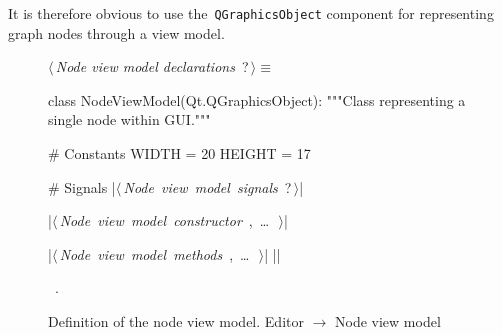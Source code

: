 \documentclass[%
    a4paper,    %
    justified,  %
    nobib,      %
    openany     %
]{tufte-book}
\begin{document}
It is therefore obvious to use the~\verb=QGraphicsObject= component
for representing graph nodes through a view model.

\begin{figure}
\begin{flushleft} \small
\begin{minipage}{\linewidth}\label{scrap68}\raggedright\small
{} $\langle\,${\itshape Node view model declarations}\nobreak\ {\footnotesize {?}}$\,\rangle\equiv$
\vspace{-1ex}
\begin{pythoncode}
class NodeViewModel(Qt.QGraphicsObject):
    """Class representing a single node within GUI."""

    # Constants
    WIDTH = 20
    HEIGHT = 17

    # Signals
    |\hbox{$\langle\,${\itshape Node view model signals}\nobreak\ {\footnotesize ?}$\,\rangle$}|

    |\hbox{$\langle\,${\itshape Node view model constructor}\nobreak\ {\footnotesize {}, \ldots\ }$\,\rangle$}|

    |\hbox{$\langle\,${\itshape Node view model methods}\nobreak\ {\footnotesize {}, \ldots\ }$\,\rangle$}|
|\NWsep|
\end{pythoncode}
\vspace{1.5ex}
\footnotesize
\begin{list}{}{\setlength{\itemsep}{-\parsep}\setlength{\itemindent}{-\leftmargin}}
\item \NWtxtMacroRefIn\ .

\item{}
\end{list}
\end{minipage}\vspace{4ex}
\end{flushleft}
\caption{Definition of the node view model.
  \newline{}\newline{}Editor $\rightarrow$ Node view model}
\label{editor:lst:node-view-model}
\end{figure}
\end{document}
